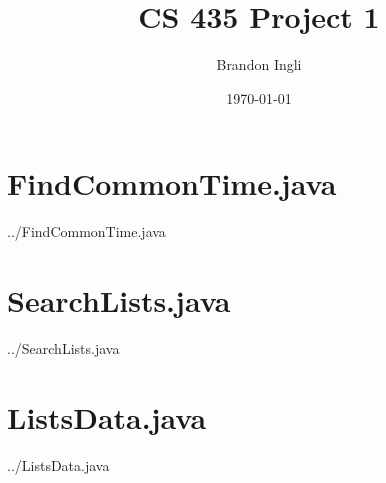 \documentclass[11pt]{article}
\title{CS 435 Project 1}
\author{Brandon Ingli}
\date{\today}
\begin{document}
\maketitle
\thispagestyle{empty}

\section*{FindCommonTime.java}

{../FindCommonTime.java} %


\clearpage

\section*{SearchLists.java}

{../SearchLists.java} %

\clearpage

\section*{ListsData.java}

{../ListsData.java} %
\end{document}

